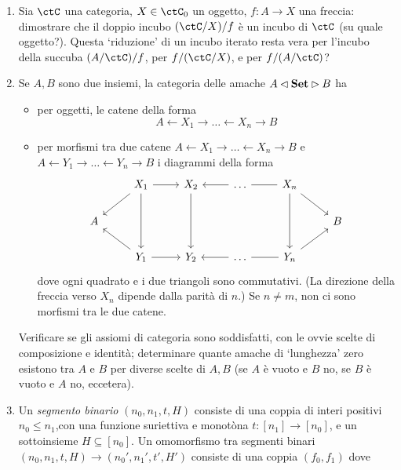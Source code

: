 \begin{enumerate}
	\item Sia $\ctC$ una categoria, $X\in\ctC_0$ un oggetto, $f : A\to X$ una freccia: dimostrare che il doppio incubo $(\ctC/X)/f$ è un incubo di $\ctC$ (su quale oggetto?). Questa `riduzione' di un incubo iterato resta vera per l'incubo della succuba $(A/\ctC)/f$, per $f/(\ctC/X)$, e per $f/(A/\ctC)$?
	\item Se $A,B$ sono due insiemi, la categoria delle amache $A\lhd\mathbf{Set}\rhd B$ ha
	\begin{itemize}
		\item per oggetti, le catene della forma
		\[A \leftarrow X_1 \to \dots \leftarrow X_n \to B\]
		\item per morfismi tra due catene $A \leftarrow X_1 \to \dots \leftarrow X_n \to B$ e $A \leftarrow Y_1 \to \dots \leftarrow Y_n \to B$ i diagrammi della forma
\[\begin{tikzcd}
	& {X_1} & {X_2} & \dots & {X_n} \\
	A &&&&& B \\
	& {Y_1} & {Y_2} & \dots & {Y_n}
	\arrow[from=1-2, to=2-1]
	\arrow[from=3-2, to=2-1]
	\arrow[from=1-2, to=1-3]
	\arrow[from=1-5, to=2-6]
	\arrow[from=3-5, to=2-6]
	\arrow[from=1-4, to=1-3]
	\arrow[no head, from=1-4, to=1-5]
	\arrow[from=3-2, to=3-3]
	\arrow[from=3-4, to=3-3]
	\arrow[no head, from=3-4, to=3-5]
	\arrow[from=1-2, to=3-2]
	\arrow[from=1-3, to=3-3]
	\arrow[from=1-5, to=3-5]
\end{tikzcd}\]
dove ogni quadrato e i due triangoli sono commutativi. (La direzione della freccia verso $X_n$ dipende dalla parità di $n$.) Se $n\ne m$, non ci sono morfismi tra le due catene.
\end{itemize}
Verificare se gli assiomi di categoria sono soddisfatti, con le ovvie scelte di composizione e identità; determinare quante amache di `lunghezza' zero esistono tra $A$ e $B$ per diverse scelte di $A,B$ (se $A$ è vuoto e $B$ no, se $B$ è vuoto e $A$ no, eccetera).
	\item Un \emph{segmento binario} $(n_0,n_1,t,H)$ consiste di una coppia di interi positivi $n_0 \le n_1$,con una funzione suriettiva e monotòna $t : [n_1] \to [n_0]$, e un sottoinsieme $H\subseteq [n_0]$. Un omomorfismo tra segmenti binari $(n_0,n_1,t,H) \to (n_0',n_1',t',H')$ consiste di una coppia $(f_0,f_1)$ dove

\end{enumerate}
